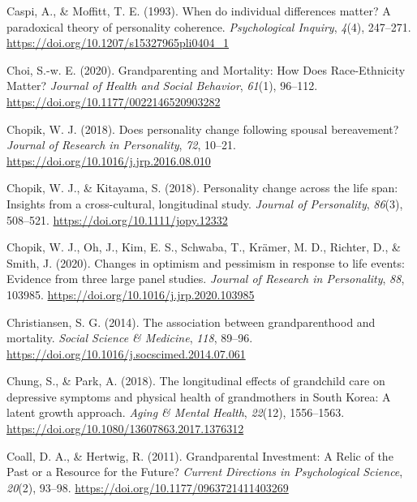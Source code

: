 \documentclass[
  english,
  man, noextraspace]{apa7}
\begin{document}
\leavevmode\hypertarget{ref-caspiWhenIndividualDifferences1993}{}%
Caspi, A., \& Moffitt, T. E. (1993). When do individual differences matter? A paradoxical theory of personality coherence. \emph{Psychological Inquiry}, \emph{4}(4), 247--271. \url{https://doi.org/10.1207/s15327965pli0404_1}

\leavevmode\hypertarget{ref-choiGrandparentingMortalityHow2020}{}%
Choi, S.-w. E. (2020). Grandparenting and Mortality: How Does Race-Ethnicity Matter? \emph{Journal of Health and Social Behavior}, \emph{61}(1), 96--112. \url{https://doi.org/10.1177/0022146520903282}

\leavevmode\hypertarget{ref-chopikDoesPersonalityChange2018}{}%
Chopik, W. J. (2018). Does personality change following spousal bereavement? \emph{Journal of Research in Personality}, \emph{72}, 10--21. \url{https://doi.org/10.1016/j.jrp.2016.08.010}

\leavevmode\hypertarget{ref-chopikPersonalityChangeLife2018}{}%
Chopik, W. J., \& Kitayama, S. (2018). Personality change across the life span: Insights from a cross-cultural, longitudinal study. \emph{Journal of Personality}, \emph{86}(3), 508--521. \url{https://doi.org/10.1111/jopy.12332}

\leavevmode\hypertarget{ref-chopikChangesOptimismPessimism2020}{}%
Chopik, W. J., Oh, J., Kim, E. S., Schwaba, T., Krämer, M. D., Richter, D., \& Smith, J. (2020). Changes in optimism and pessimism in response to life events: Evidence from three large panel studies. \emph{Journal of Research in Personality}, \emph{88}, 103985. \url{https://doi.org/10.1016/j.jrp.2020.103985}

\leavevmode\hypertarget{ref-christiansenAssociationGrandparenthoodMortality2014}{}%
Christiansen, S. G. (2014). The association between grandparenthood and mortality. \emph{Social Science \& Medicine}, \emph{118}, 89--96. \url{https://doi.org/10.1016/j.socscimed.2014.07.061}

\leavevmode\hypertarget{ref-chungLongitudinalEffectsGrandchild2018}{}%
Chung, S., \& Park, A. (2018). The longitudinal effects of grandchild care on depressive symptoms and physical health of grandmothers in South Korea: A latent growth approach. \emph{Aging \& Mental Health}, \emph{22}(12), 1556--1563. \url{https://doi.org/10.1080/13607863.2017.1376312}

\leavevmode\hypertarget{ref-coallGrandparentalInvestmentRelic2011}{}%
Coall, D. A., \& Hertwig, R. (2011). Grandparental Investment: A Relic of the Past or a Resource for the Future? \emph{Current Directions in Psychological Science}, \emph{20}(2), 93--98. \url{https://doi.org/10.1177/0963721411403269}
\end{document}
